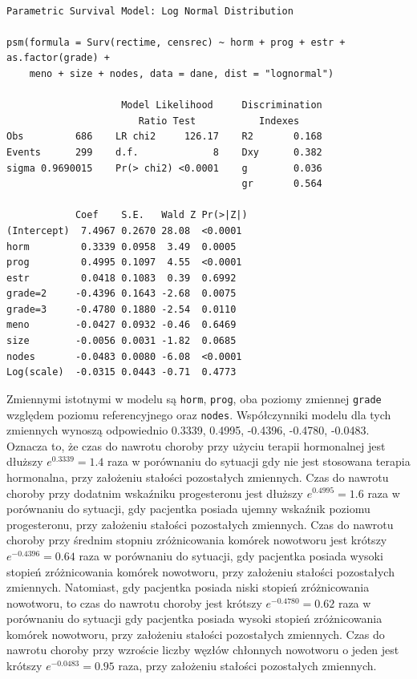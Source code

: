 \documentclass[]{article}
\begin{document}
\begin{verbatim}

Parametric Survival Model: Log Normal Distribution

psm(formula = Surv(rectime, censrec) ~ horm + prog + estr + as.factor(grade) + 
    meno + size + nodes, data = dane, dist = "lognormal")

                    Model Likelihood     Discrimination    
                       Ratio Test           Indexes        
Obs         686    LR chi2     126.17    R2       0.168    
Events      299    d.f.             8    Dxy      0.382    
sigma 0.9690015    Pr(> chi2) <0.0001    g        0.036    
                                         gr       0.564    

            Coef    S.E.   Wald Z Pr(>|Z|)
(Intercept)  7.4967 0.2670 28.08  <0.0001 
horm         0.3339 0.0958  3.49  0.0005  
prog         0.4995 0.1097  4.55  <0.0001 
estr         0.0418 0.1083  0.39  0.6992  
grade=2     -0.4396 0.1643 -2.68  0.0075  
grade=3     -0.4780 0.1880 -2.54  0.0110  
meno        -0.0427 0.0932 -0.46  0.6469  
size        -0.0056 0.0031 -1.82  0.0685  
nodes       -0.0483 0.0080 -6.08  <0.0001 
Log(scale)  -0.0315 0.0443 -0.71  0.4773  
\end{verbatim}

Zmiennymi istotnymi w modelu są \texttt{horm}, \texttt{prog}, oba
poziomy zmiennej \texttt{grade} względem poziomu referencyjnego oraz
\texttt{nodes}. Współczynniki modelu dla tych zmiennych wynoszą
odpowiednio 0.3339, 0.4995, -0.4396, -0.4780, -0.0483. Oznacza to, że
czas do nawrotu choroby przy użyciu terapii hormonalnej jest dłuższy
\(e^{0.3339} = 1.4\) raza w porównaniu do sytuacji gdy nie jest
stosowana terapia hormonalna, przy założeniu stałości pozostałych
zmiennych. Czas do nawrotu choroby przy dodatnim wskaźniku progesteronu
jest dłuższy \(e^{0.4995} = 1.6\) raza w porównaniu do sytuacji, gdy
pacjentka posiada ujemny wskaźnik poziomu progesteronu, przy założeniu
stałości pozostałych zmiennych. Czas do nawrotu choroby przy średnim
stopniu zróżnicowania komórek nowotworu jest krótszy
\(e^{-0.4396} = 0.64\) raza w porównaniu do sytuacji, gdy pacjentka
posiada wysoki stopień zróżnicowania komórek nowotworu, przy założeniu
stałości pozostałych zmiennych. Natomiast, gdy pacjentka posiada niski
stopień zróżnicowania nowotworu, to czas do nawrotu choroby jest krótszy
\(e^{-0.4780} = 0.62\) raza w porównaniu do sytuacji gdy pacjentka
posiada wysoki stopień zróżnicowania komórek nowotworu, przy założeniu
stałości pozostałych zmiennych. Czas do nawrotu choroby przy wzroście
liczby węzłów chłonnych  nowotworu o jeden jest
krótszy \(e^{-0.0483} = 0.95\) raza, przy założeniu stałości pozostałych
zmiennych.
\end{document}
